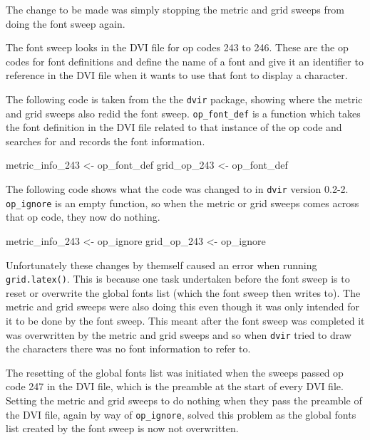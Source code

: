 \documentclass[]{article}
\newenvironment{Shaded}{\begin{snugshade}}{\end{snugshade}}
\newcommand{\DecValTok}[1]{\textcolor[rgb]{0.00,0.00,0.81}{#1}}
\newcommand{\StringTok}[1]{\textcolor[rgb]{0.31,0.60,0.02}{#1}}
\newcommand{\NormalTok}[1]{#1}
\begin{document}
The change to be made was simply stopping the metric and grid sweeps
from doing the font sweep again.

The font sweep looks in the DVI file for op codes 243 to 246. These are
the op codes for font definitions and define the name of a font and give
it an identifier to reference in the DVI file when it wants to use that
font to display a character.

The following code is taken from the the \texttt{dvir} package, showing
where the metric and grid sweeps also redid the font sweep.
\texttt{op\_font\_def} is a function which takes the font definition in
the DVI file related to that instance of the op code and searches for
and records the font information.

\begin{Shaded}
\begin{Highlighting}[]
\NormalTok{metric_info_}\DecValTok{243}\NormalTok{ <-}\StringTok{ }\NormalTok{op_font_def}
\NormalTok{grid_op_}\DecValTok{243}\NormalTok{ <-}\StringTok{ }\NormalTok{op_font_def}
\end{Highlighting}
\end{Shaded}

The following code shows what the code was changed to in \texttt{dvir}
version 0.2-2. \texttt{op\_ignore} is an empty function, so when the
metric or grid sweeps comes across that op code, they now do nothing.

\begin{Shaded}
\begin{Highlighting}[]
\NormalTok{metric_info_}\DecValTok{243}\NormalTok{ <-}\StringTok{ }\NormalTok{op_ignore}
\NormalTok{grid_op_}\DecValTok{243}\NormalTok{ <-}\StringTok{ }\NormalTok{op_ignore}
\end{Highlighting}
\end{Shaded}

Unfortunately these changes by themself caused an error when running
\texttt{grid.latex()}. This is because one task undertaken before the
font sweep is to reset or overwrite the global fonts list (which the
font sweep then writes to). The metric and grid sweeps were also doing
this even though it was only intended for it to be done by the font
sweep. This meant after the font sweep was completed it was overwritten
by the metric and grid sweeps and so when \texttt{dvir} tried to draw
the characters there was no font information to refer to.

The resetting of the global fonts list was initiated when the sweeps
passed op code 247 in the DVI file, which is the preamble at the start
of every DVI file. Setting the metric and grid sweeps to do nothing when
they pass the preamble of the DVI file, again by way of
\texttt{op\_ignore}, solved this problem as the global fonts list
created by the font sweep is now not overwritten.
\end{document}
